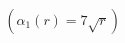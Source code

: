 \documentclass[preview]{standalone}
\begin{document}
\begin{align*}
&{}\quad\quad \quad (\alpha_1(r) = 7 \sqrt{r})
\end{align*}
\end{document}
